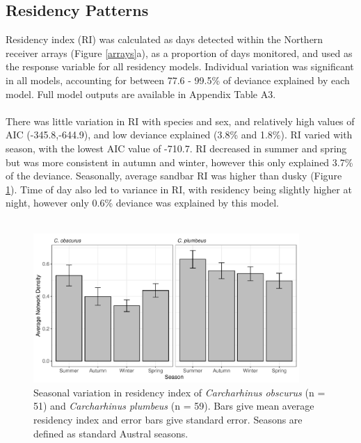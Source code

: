 \documentclass[11pt,a4paper]{article}
\begin{document}
	
	
	
	
	\subsection{Residency Patterns}
	
	Residency index (RI) was calculated as days detected within the Northern receiver arrays (Figure \ref{arrays}a), as a proportion of days monitored, and used as the response variable for all residency models. Individual variation was significant in all models, accounting for between 77.6 - 99.5\% of deviance explained by each model. Full model outputs are available in Appendix Table A3.\\
	\\
	There was little variation in RI with species and sex, and relatively high values of AIC (-345.8,-644.9), and low deviance explained (3.8\% and 1.8\%). RI varied with season, with the lowest AIC value of -710.7. RI decreased in summer and spring but was more consistent in autumn and winter, however this only explained 3.7\% of the deviance. Seasonally, average sandbar RI was higher than dusky (Figure \ref{ri_seasons}). Time of day also led to variance in RI, with residency being slightly higher at night, however only 0.6\% deviance was explained by this model.\\
	\\
	
	\begin{figure}[h!]
		\centering\includegraphics[width=0.9\textwidth]{../Results/network_season.pdf}
		\caption{Seasonal variation in residency index of \textit{Carcharhinus obscurus} (n = 51) and \textit{Carcharhinus plumbeus} (n = 59). Bars give mean average residency index and error bars give standard error. Seasons are defined as standard Austral seasons.}
		\label{ri_seasons}
	\end{figure}		
	
\end{document}
